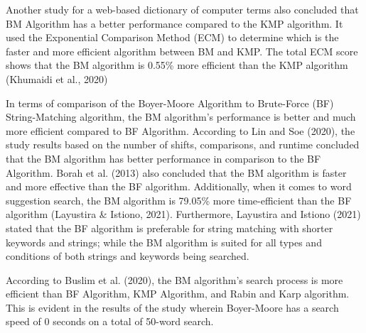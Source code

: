 \hfill

Another study for a web-based dictionary of computer terms also concluded that BM Algorithm has a
better performance compared to the KMP algorithm. It used the Exponential Comparison Method (ECM) to
determine which is the faster and more efficient algorithm between BM and KMP. The total ECM score
shows that the BM algorithm is 0.55\% more efficient than the KMP algorithm (Khumaidi et al., 2020)

\hfill

In terms of comparison of the Boyer-Moore Algorithm to Brute-Force (BF) String-Matching algorithm,
the BM algorithm’s performance is better and much more efficient compared to BF Algorithm. According
to Lin and Soe (2020), the study results based on the number of shifts, comparisons, and runtime
concluded that the BM algorithm has better performance in comparison to the BF Algorithm. Borah et
al. (2013) also concluded that the BM algorithm is faster and more effective than the BF algorithm.
Additionally, when it comes to word suggestion search, the BM algorithm is 79.05\% more
time-efficient than the BF algorithm (Layustira \& Istiono, 2021). Furthermore, Layustira and
Istiono (2021) stated that the BF algorithm is preferable for string matching with shorter keywords
and strings; while the BM algorithm is suited for all types and conditions of both strings and
keywords being searched.

\hfill

According to Buslim et al. (2020), the BM algorithm’s search process is more efficient than BF
Algorithm, KMP Algorithm, and Rabin and Karp algorithm. This is evident in the results of the study
wherein Boyer-Moore has a search speed of 0 seconds on a total of 50-word search.
